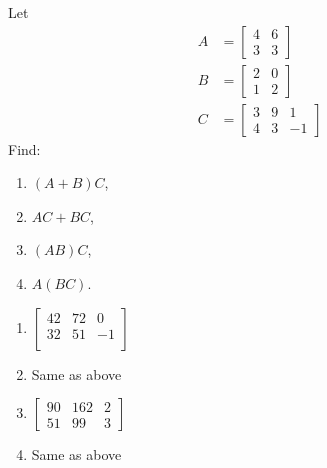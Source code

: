 \begin{Exercise}
Let
\begin{align*}
A &=
\begin{bmatrix}
4 & 6\\
3 & 3
\end{bmatrix} \\
B &= 
\begin{bmatrix}
2 & 0\\
1 & 2
\end{bmatrix} \\
C &= 
\begin{bmatrix}
3 & 9 & 1\\
4 & 3 & -1
\end{bmatrix}
\end{align*}
Find:
\begin{enumerate}[label=(\alph*)]
\item $(A+B)C$,
\item $AC+BC$,
\item $(AB)C$,
\item $A(BC)$.
\end{enumerate}
\end{Exercise}
\begin{Answer}
\begin{enumerate}[label=(\alph*)]
\item $\begin{bmatrix}
42 & 72 & 0 \\ 
32 & 51 & -1 \\
\end{bmatrix}$
\item Same as above
\item $\begin{bmatrix}
90 & 162 & 2 \\
51 & 99 & 3
\end{bmatrix}$
\item Same as above
\end{enumerate}
\end{Answer}

